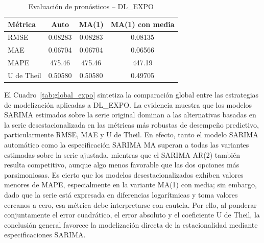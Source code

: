 \documentclass[11pt]{article}
\begin{document}
\begin{table}[H]
\centering
\caption{Evaluación de pronósticos – DL\_EXPO}
\label{tab:forecast_expo}
\begin{tabular}{lccc}
\hline
Métrica & Auto & MA(1) & MA(1) con media \\
\hline
RMSE    & 0.08283 & 0.08283 & 0.08135 \\
MAE     & 0.06704 & 0.06704 & 0.06566 \\
MAPE    & 475.46  & 475.46  & 447.19 \\
U de Theil & 0.50580 & 0.50580 & 0.49705 \\
\hline
\end{tabular}
\end{table}

El Cuadro~\ref{tab:global_expo} sintetiza la comparación global entre las estrategias de modelización aplicadas a DL\_EXPO. La evidencia muestra que los modelos SARIMA estimados sobre la serie original dominan a las alternativas basadas en la serie desestacionalizada en las métricas más robustas de desempeño predictivo, particularmente RMSE, MAE y U de Theil. En efecto, tanto el modelo SARIMA automático como la especificación SARIMA MA superan a todas las variantes estimadas sobre la serie ajustada, mientras que el SARIMA AR(2) también resulta competitivo, aunque algo menos favorable que las dos opciones más parsimoniosas. Es cierto que los modelos desestacionalizados exhiben valores menores de MAPE, especialmente en la variante MA(1) con media; sin embargo, dado que la serie está expresada en diferencias logarítmicas y toma valores cercanos a cero, esa métrica debe interpretarse con cautela. Por ello, al ponderar conjuntamente el error cuadrático, el error absoluto y el coeficiente U de Theil, la conclusión general favorece la modelización directa de la estacionalidad mediante especificaciones SARIMA.

\begin{table}[H]
\centering
\caption{Comparación global de modelos de pronóstico – DL\_EXPO}
\label{tab:global_expo}
\end{table}
\end{document}

